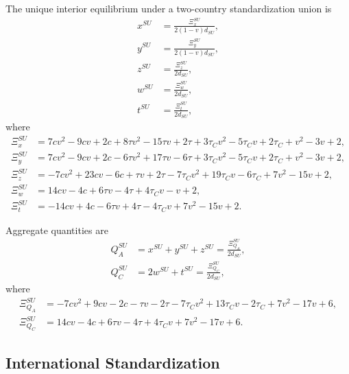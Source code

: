 \begin{lemma}
The unique interior equilibrium under a two-country standardization union is
\begin{align}
x^{SU} &= \frac{\Xi_x^{SU}}{2(1-v)d_{SU}}, \label{eq:xsu_main}\\
y^{SU} &= \frac{\Xi_y^{SU}}{2(1-v)d_{SU}}, \label{eq:ysu_main}\\
z^{SU} &= \frac{\Xi_z^{SU}}{2d_{SU}}, \label{eq:zsu_main}\\
w^{SU} &= \frac{\Xi_w^{SU}}{2d_{SU}}, \label{eq:wsu_main}\\
t^{SU} &= \frac{\Xi_t^{SU}}{2d_{SU}}, \label{eq:tsu_main}
\end{align}
where
\begin{align}
\Xi_x^{SU}
&= 7cv^2-9cv+2c
+8\tau v^2-15\tau v+2\tau
+3\tau_C v^2-5\tau_C v+2\tau_C
+v^2-3v+2, \label{eq:Xix_su_main}\\
\Xi_y^{SU}
&= 7cv^2-9cv+2c
-6\tau v^2+17\tau v-6\tau
+3\tau_C v^2-5\tau_C v+2\tau_C
+v^2-3v+2, \label{eq:Xiy_su_main}\\
\Xi_z^{SU}
&= -7cv^2+23cv-6c
+\tau v+2\tau
-7\tau_C v^2+19\tau_C v-6\tau_C
+7v^2-15v+2, \label{eq:Xiz_su_main}\\
\Xi_w^{SU}
&= 14cv-4c+6\tau v-4\tau+4\tau_C v-v+2, \label{eq:Xiw_su_main}\\
\Xi_t^{SU}
&= -14cv+4c-6\tau v+4\tau-4\tau_C v+7v^2-15v+2. \label{eq:Xit_su_main}
\end{align}
\end{lemma}

\noindent
Aggregate quantities are
\begin{align}
Q_A^{SU}
&= x^{SU}+y^{SU}+z^{SU}
= \frac{\Xi_{Q_A}^{SU}}{2d_{SU}}, \label{eq:QAsu_main}\\
Q_C^{SU}
&= 2w^{SU}+t^{SU}
= \frac{\Xi_{Q_C}^{SU}}{2d_{SU}}, \label{eq:QCsu_main}
\end{align}
where
\begin{align}
\Xi_{Q_A}^{SU}
&= -7cv^2+9cv-2c
-\tau v-2\tau
-7\tau_C v^2+13\tau_C v-2\tau_C
+7v^2-17v+6, \label{eq:XiQA_su_main}\\
\Xi_{Q_C}^{SU}
&= 14cv-4c+6\tau v-4\tau+4\tau_C v+7v^2-17v+6. \label{eq:XiQC_su_main}
\end{align}

\subsection{International Standardization}

